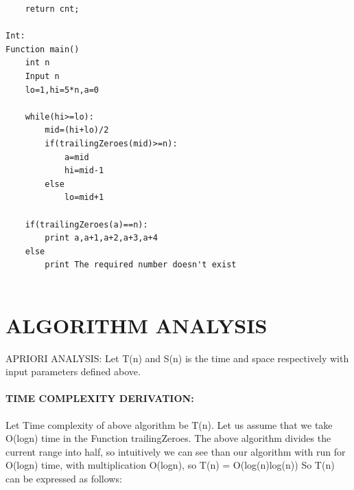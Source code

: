 \documentclass[10pt]{article}
\begin{document}
\begin{multicols*}{2}
\begin{lstlisting}
    return cnt; 

Int:
Function main()
    int n
    Input n
    lo=1,hi=5*n,a=0
    
    while(hi>=lo):
        mid=(hi+lo)/2
        if(trailingZeroes(mid)>=n):
            a=mid
            hi=mid-1
        else
            lo=mid+1
    
    if(trailingZeroes(a)==n):
        print a,a+1,a+2,a+3,a+4
    else
        print The required number doesn't exist


\end{lstlisting}
    

	
\section*{ALGORITHM ANALYSIS} 
	
APRIORI ANALYSIS: Let T(n) and S(n) is the time and space respectively with input parameters defined above.

\paragraph{TIME COMPLEXITY DERIVATION:} Let Time complexity of above algorithm be T(n). Let us assume that we take O(logn) time in the Function trailingZeroes. The above algorithm divides the current range into half, so intuitively we can see than our algorithm with run for O(logn) time, with multiplication O(logn), so T(n) = O(log(n)log(n)) So T(n) can be expressed as follows:\\


\end{multicols*}
\end{document}
